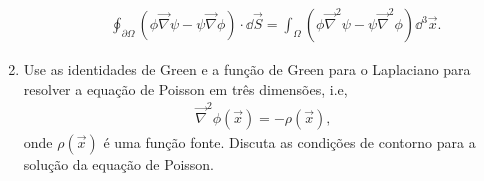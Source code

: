 \begin{enumerate}
\begin{enumerate}
		            \begin{align}
			            \oint_{\partial\Omega}\left(\phi\vec\nabla\psi-\psi\vec\nabla\phi\right)\cdot\dd\vec{S} =
			            \int_{\Omega}\left(\phi\vec\nabla^2\psi-\psi\vec\nabla^2\phi\right)\dd^3\vec{x}.
		            \end{align}
	      \end{enumerate}
	\item Use as identidades de Green e a função de Green para o Laplaciano para
	      resolver a equação de Poisson em três dimensões, i.e,
	      \begin{align}
		      \vec\nabla^2\phi(\vec{x}) = -\rho(\vec{x}),
	      \end{align}
	      onde $\rho(\vec{x})$ é uma função fonte. Discuta as condições de contorno
	      para a solução da equação de Poisson.
\end{enumerate}

